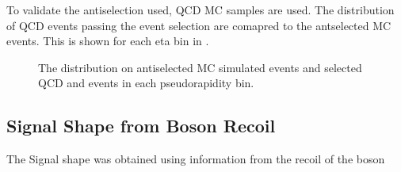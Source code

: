 To validate the antiselection used, \ac{QCD} \ac{MC} samples are used. The
distribution of \ac{QCD} events passing the event selection are comapred to the
antselected MC events. This is shown for each eta bin in
.

\begin{figure}[htb]
  \centering
  \caption{The \ETm distribution on antiselected \ac{MC} simulated events
  and selected \ac{QCD} and \gjet events in each pseudorapidity bin.}
  \label{asym36:antiselclosure}
\end{figure}

\subsection{Signal \ETm Shape from Boson Recoil}

The Signal \ETm shape was obtained using information from the recoil of the
boson


